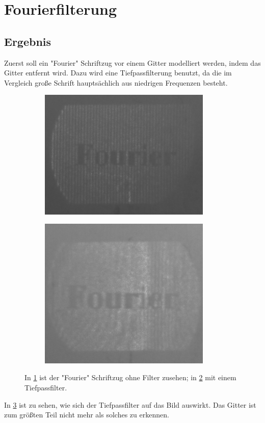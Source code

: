 \section{Fourierfilterung}
\subsection{Ergebnis}
Zuerst soll ein "Fourier" Schriftzug vor einem Gitter modelliert werden, indem das Gitter entfernt wird. Dazu wird eine Tiefpassfilterung benutzt, da die im Vergleich große Schrift hauptsächlich aus niedrigen Frequenzen besteht. 


\begin{figure}[h]
\begin{subfigure}[c]{0.5\textwidth}

\includegraphics[width=0.9\textwidth]{Fourier.png}
	      \caption{}
          \label{fig:NiceImage1}
          
\end{subfigure}
\begin{subfigure}[c]{0.5\textwidth}
	\includegraphics[width=0.9\textwidth]{Fourier_Filter.png}
	      \caption{}
          \label{fig:NiceImage2}
\end{subfigure}
\caption{In \cref{fig:NiceImage1} ist der "Fourier" Schriftzug ohne Filter zusehen; in \cref{fig:NiceImage2} mit einem Tiefpassfilter.}
\label{Fourier}
\end{figure}   

In \cref{Fourier} ist zu sehen, wie sich der Tiefpassfilter auf das Bild auswirkt. Das Gitter ist zum größten Teil nicht mehr als solches zu erkennen.